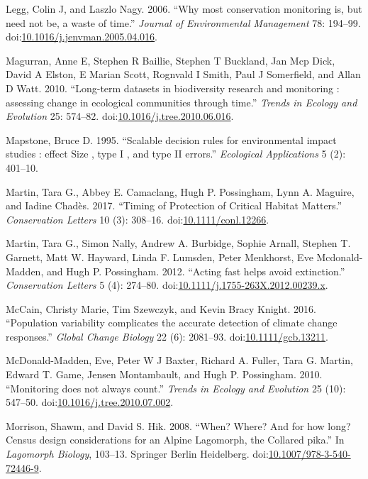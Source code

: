 \documentclass[12pt,]{article}
\begin{document}
\begin{spacing}{2}
\hypertarget{ref-Legg2006}{}
Legg, Colin J, and Laszlo Nagy. 2006. ``Why most conservation monitoring
is, but need not be, a waste of time.'' \emph{Journal of Environmental
Management} 78: 194--99.
doi:\href{https://doi.org/10.1016/j.jenvman.2005.04.016}{10.1016/j.jenvman.2005.04.016}.

\hypertarget{ref-Magurran2010}{}
Magurran, Anne E, Stephen R Baillie, Stephen T Buckland, Jan Mcp Dick,
David A Elston, E Marian Scott, Rognvald I Smith, Paul J Somerfield, and
Allan D Watt. 2010. ``Long-term datasets in biodiversity research and
monitoring : assessing change in ecological communities through time.''
\emph{Trends in Ecology and Evolution} 25: 574--82.
doi:\href{https://doi.org/10.1016/j.tree.2010.06.016}{10.1016/j.tree.2010.06.016}.

\hypertarget{ref-Mapstone1995}{}
Mapstone, Bruce D. 1995. ``Scalable decision rules for environmental
impact studies : effect Size , type I , and type II errors.''
\emph{Ecological Applications} 5 (2): 401--10.

\hypertarget{ref-Martin2017}{}
Martin, Tara G., Abbey E. Camaclang, Hugh P. Possingham, Lynn A.
Maguire, and Iadine Chadès. 2017. ``Timing of Protection of Critical
Habitat Matters.'' \emph{Conservation Letters} 10 (3): 308--16.
doi:\href{https://doi.org/10.1111/conl.12266}{10.1111/conl.12266}.

\hypertarget{ref-Martin2012}{}
Martin, Tara G., Simon Nally, Andrew A. Burbidge, Sophie Arnall, Stephen
T. Garnett, Matt W. Hayward, Linda F. Lumsden, Peter Menkhorst, Eve
Mcdonald-Madden, and Hugh P. Possingham. 2012. ``Acting fast helps avoid
extinction.'' \emph{Conservation Letters} 5 (4): 274--80.
doi:\href{https://doi.org/10.1111/j.1755-263X.2012.00239.x}{10.1111/j.1755-263X.2012.00239.x}.

\hypertarget{ref-McCain2016}{}
McCain, Christy Marie, Tim Szewczyk, and Kevin Bracy Knight. 2016.
``Population variability complicates the accurate detection of climate
change responses.'' \emph{Global Change Biology} 22 (6): 2081--93.
doi:\href{https://doi.org/10.1111/gcb.13211}{10.1111/gcb.13211}.

\hypertarget{ref-McDonald-Madden2010}{}
McDonald-Madden, Eve, Peter W J Baxter, Richard A. Fuller, Tara G.
Martin, Edward T. Game, Jensen Montambault, and Hugh P. Possingham.
2010. ``Monitoring does not always count.'' \emph{Trends in Ecology and
Evolution} 25 (10): 547--50.
doi:\href{https://doi.org/10.1016/j.tree.2010.07.002}{10.1016/j.tree.2010.07.002}.

\hypertarget{ref-Morrison2008}{}
Morrison, Shawm, and David S. Hik. 2008. ``When? Where? And for how
long? Census design considerations for an Alpine Lagomorph, the Collared
pika.'' In \emph{Lagomorph Biology}, 103--13. Springer Berlin
Heidelberg.
doi:\href{https://doi.org/10.1007/978-3-540-72446-9}{10.1007/978-3-540-72446-9}.


\end{spacing}
\end{document}
